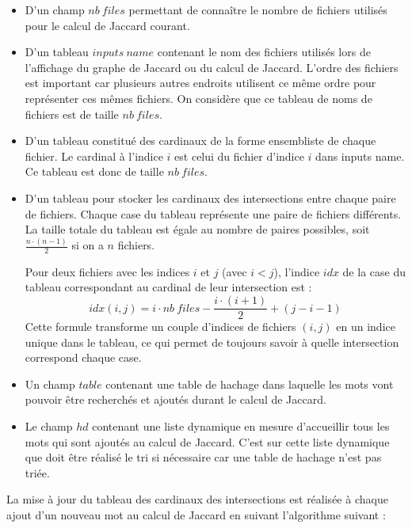 \documentclass[a4paper, 12pt]{article}
\begin{document}
\begin{itemize}
    \item D'un champ $nb\ files$ permettant de connaître le nombre de fichiers utilisés pour le calcul de Jaccard courant.
    \item D'un tableau $inputs\ name$ contenant le nom des fichiers utilisés lors de l'affichage du graphe de Jaccard ou du calcul de Jaccard. L'ordre des fichiers est important car plusieurs autres endroits utilisent ce même ordre pour représenter ces mêmes fichiers. On considère que ce tableau de noms de fichiers est de taille $nb\ files$.
    \item D'un tableau constitué des cardinaux de la forme ensembliste de chaque fichier. Le cardinal à l'indice $i$ est celui du fichier d'indice $i$ dans inputs name. Ce tableau est donc de taille $nb \ files$.
    
    \item D'un tableau pour stocker les cardinaux des intersections entre chaque paire de fichiers. Chaque case du tableau représente une paire de fichiers différents. La taille totale du tableau est égale au nombre de paires possibles, soit $\frac{n \cdot (n - 1)}{2}$ si on a $n$ fichiers.
    
    Pour deux fichiers avec les indices $i$ et $j$ (avec $i < j$), l'indice $idx$ de la case du tableau correspondant au cardinal de leur intersection est :  
    $$
        idx(i, j) = i \cdot nb\ files - \frac{i \cdot (i + 1)}{2} + (j - i - 1)
    $$
    Cette formule transforme un couple d'indices de fichiers $(i, j)$ en un indice unique dans le tableau, ce qui permet de toujours savoir à quelle intersection correspond chaque case.

    \item Un champ $table$ contenant une table de hachage dans laquelle les mots vont pouvoir être recherchés et ajoutés durant le calcul de Jaccard.
    
    \item Le champ $hd$ contenant une liste dynamique en mesure d'accueillir tous les mots qui sont ajoutés au calcul de Jaccard. C'est sur cette liste dynamique que doit être réalisé le tri si nécessaire car une table de hachage n'est pas triée.
\end{itemize}

La mise à jour du tableau des cardinaux des intersections est réalisée à chaque ajout d'un nouveau mot au calcul de Jaccard en suivant l'algorithme suivant : 
\end{document}
